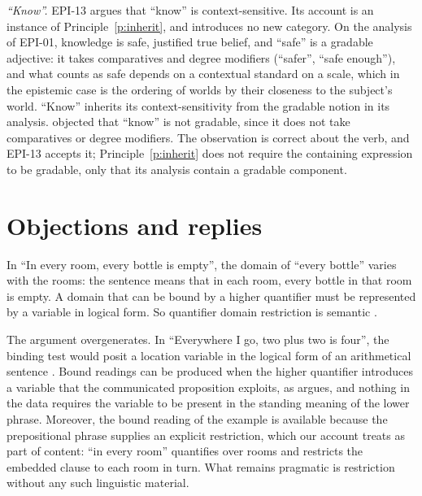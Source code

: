 \documentclass{situationist-preprint}
\begin{document}
\emph{\enquote{Know}.} EPI-13 argues that \enquote{know} is context-sensitive. Its account is an instance of Principle~\ref{p:inherit}, and introduces no new category. On the analysis of EPI-01, knowledge is safe, justified true belief, and \enquote{safe} is a gradable adjective: it takes comparatives and degree modifiers (\enquote{safer}, \enquote{safe enough}), and what counts as safe depends on a contextual standard on a scale, which in the epistemic case is the ordering of worlds by their closeness to the subject's world. \enquote{Know} inherits its context-sensitivity from the gradable notion in its analysis. \citet{Stanley2004} objected that \enquote{know} is not gradable, since it does not take comparatives or degree modifiers. The observation is correct about the verb, and EPI-13 accepts it; Principle~\ref{p:inherit} does not require the containing expression to be gradable, only that its analysis contain a gradable component.

\section{Objections and replies}

\begin{objection}[Binding]\label{o:bind}
In \enquote{In every room, every bottle is empty}, the domain of \enquote{every bottle} varies with the rooms: the sentence means that in each room, every bottle in that room is empty. A domain that can be bound by a higher quantifier must be represented by a variable in logical form. So quantifier domain restriction is semantic \citep{StanleySzabo2000,Stanley2000}.
\end{objection}

\begin{reply}
The argument overgenerates. In \enquote{Everywhere I go, two plus two is four}, the binding test would posit a location variable in the logical form of an arithmetical sentence \citep{CappelenLepore2002}. Bound readings can be produced when the higher quantifier introduces a variable that the communicated proposition exploits, as \citet{Recanati2004} argues, and nothing in the data requires the variable to be present in the standing meaning of the lower phrase. Moreover, the bound reading of the example is available because the prepositional phrase supplies an explicit restriction, which our account treats as part of content: \enquote{in every room} quantifies over rooms and restricts the embedded clause to each room in turn. What remains pragmatic is restriction without any such linguistic material.
\end{reply}
\end{document}
